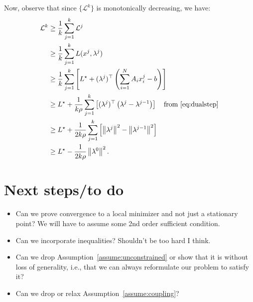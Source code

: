 \documentclass[11pt]{article}
\newcommand{\norm}[1]{\left\lVert #1 \right\rVert}
\begin{document}
Now, observe that since $\{\mathcal{L}^k\}$ is monotonically decreasing, we have:
\begin{align*}
\mathcal{L}^k &\geq \frac{1}{k}\sum_{j=1}^{k} \mathcal{L}^j \\
&\geq \frac{1}{k}\sum_{j=1}^k L(x^j, \lambda^j) \\
&\geq \frac{1}{k}\sum_{j=1}^k \left[L^\star + (\lambda^j)^\top \left(\sum_{i=1}^N A_i x_i^j - b\right) \right] \\
&\geq L^\star + \frac{1}{k\rho}\sum_{j=1}^k \left[(\lambda^j)^\top \left(\lambda^j - \lambda^{j-1}\right)\right] \quad \text{from~\eqref{eq:dualstep}}\\
&\geq L^\star + \frac{1}{2k\rho}\sum_{j=1}^k \left[\norm{\lambda^j}^2  - \norm{\lambda^{j-1}}^2\right] \\
&\geq L^\star - \frac{1}{2k\rho}\norm{\lambda^{0}}^2.
\end{align*}


\section{Next steps/to do}
\begin{itemize}
    \item Can we prove convergence to a local minimizer and not just a stationary point? We will have to assume some 2nd order sufficient condition.
    
    \item Can we incorporate inequalities? Shouldn't be too hard I think.
    
    \item Can we drop Assumption~\eqref{assume:unconstrained} or show that it is without loss of generality, i.e., that we can always reformulate our problem to satisfy it?
    
    \item Can we drop or relax Assumption~\eqref{assume:coupling}?
\end{itemize}
\end{document}
